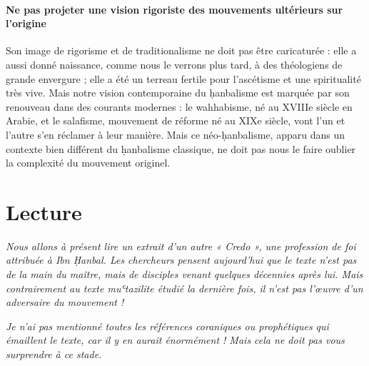 \paragraph{Ne pas projeter une vision rigoriste des mouvements ultérieurs sur l'origine} Son image de rigorisme et de traditionalisme ne doit pas être
caricaturée : elle a aussi donné naissance, comme nous le verrons plus
tard, à des théologiens de grande envergure ;
elle a été un terreau fertile pour l'ascétisme et une spiritualité très
vive. Mais notre vision contemporaine du ḥanbalisme est marquée par son
renouveau dans des courants modernes : le wahhabisme, né au XVIIIe
siècle en Arabie, et le salafisme, mouvement de réforme né au XIXe
siècle, vont l'un et l'autre s'en réclamer à leur manière. Mais ce
néo-ḥanbalisme, apparu dans un contexte bien différent du ḥanbalisme
classique, ne doit pas nous le faire oublier la complexité du mouvement
originel.


\hypertarget{lecture}{%
\section{Lecture}\label{lecture}}


\emph{Nous allons à présent lire un extrait d'un autre « Credo », une
profession de foi attribuée à Ibn Ḥanbal. Les chercheurs pensent
aujourd'hui que le texte n'est pas de la main du maître, mais de
disciples venant quelques décennies après lui. Mais contrairement au
texte muʿtazilite étudié la dernière fois, il n'est pas l'œuvre d'un
adversaire du mouvement !}

\emph{Je n'ai pas mentionné toutes les références coraniques ou
prophétiques qui émaillent le texte, car il y en aurait énormément ! Mais cela ne doit pas vous surprendre à
ce stade.}

